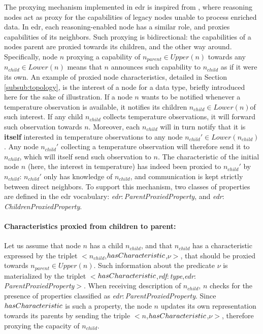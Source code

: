 \documentclass{iosart2c}
\newcommand{\namespace}[1]{\textit{#1$:$}}
\newcommand{\concept}[2]{\namespace{#1}\-\textit{#2}}
\newcommand{\triplet}[3]{$<$#1,\textit{#2},#3$>$}
\begin{document}
The proxying mechanism implemented in \gls{edr} is inspired from \cite{Nikoli2011}, where reasoning nodes act as proxy for the capabilities of legacy nodes unable to process enriched data. 
In \gls{edr}, each reasoning-enabled node has a similar role, and proxies capabilities of its neighbors. 
Such proxying is bidirectional: the capabilities of a nodes parent are proxied towards its children, and the other way around.
Specifically, node $n$ proxying a capability of $n_{parent}\in Upper(n)$ towards any $n_{child}\in Lower(n)$ means that $n$ announces such capability to $n_{child}$ as if it were its own.
An example of proxied node characteristics, detailed in Section \textsection \ref{subsub:topology}, is the interest of a node for a data type, briefly introduced here for the sake of illustration.
If a node $n$ wants to be notified whenever a temperature observation is available, it notifies its children $n_{child}\in Lower(n) $of such interest. 
If any child $n_{child}$ collects temperature observations, it will forward such observation towards $n$. 
Moreover, each $n_{child}$ will in turn notify that it is \textbf{itself} interested in temperature observations to any node $n_{child}'\in Lower(n_{child})$.
Any node $n_{child}'$ collecting a temperature observation will therefore send it to $n_{child}$, which will itself send such observation to $n$.
The characteristic of the initial node $n$ (here, the interest in temperature) has indeed been proxied to $n_{child}'$ by $n_{child}$: $n_{child}'$ only has knowledge of $n_{child}$, and communication is kept strictly between direct neighbors.
To support this mechanism, two classes of properties are defined in the \gls{edr} vocabulary: \concept{edr}{Parent\-Proxied\-Property}, and \concept{edr}{Children\-Proxied\-Property}.

\paragraph{Characteristics proxied from children to parent:}
Let us assume that node $n$ has a child $n_{child}$, and that $n_{child}$ has a characteristic expressed by the triplet \triplet{$n_{child}$}{$has\-Cha\-racteri\-stic$}{$\nu$}, that should be proxied towards $n_{parent}\in Upper(n)$.
Such information about the predicate $\nu$ is materialized by the triplet \triplet{$has\-Characteri\-stic$}{\concept{rdf}{type}}{\concept{edr}{Parent\-Proxied\-Property}}.
When receiving description of $n_{child}$, $n$ checks for the presence of properties classified as \concept{edr}{Parent\-Proxied\-Property}. 
Since $has\-Characteristic$ is such a property, the node $n$ updates its own representation towards its parents by sending the triple \triplet{$n$}{$has\-Characteri\-stic$}{$\nu$}, therefore proxying the capacity of $n_{child}$.
\end{document}
